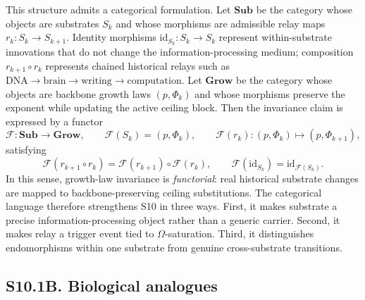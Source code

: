 \documentclass[11pt]{article}
\begin{document}
This structure admits a categorical formulation. Let $\mathbf{Sub}$ be the
category whose objects are substrates $S_k$ and whose morphisms are admissible
relay maps $r_k:S_k\to S_{k+1}$. Identity morphisms
$\mathrm{id}_{S_k}:S_k\to S_k$ represent within-substrate innovations that do
not change the information-processing medium; composition
$r_{k+1}\circ r_k$ represents chained historical relays such as
$\mathrm{DNA}\to\mathrm{brain}\to\mathrm{writing}\to\mathrm{computation}$.
Let $\mathbf{Grow}$ be the category whose objects are backbone growth laws
$(p,\Phi_k)$ and whose morphisms preserve the exponent while updating the
active ceiling block. Then the invariance claim is expressed by a functor
\begin{equation}
\mathcal F:\mathbf{Sub}\longrightarrow\mathbf{Grow},\qquad
\mathcal F(S_k)=(p,\Phi_k),\qquad
\mathcal F(r_k):(p,\Phi_k)\mapsto(p,\Phi_{k+1}),
\label{eq:S10_functor}
\end{equation}
satisfying
\begin{equation}
\mathcal F(r_{k+1}\circ r_k)=\mathcal F(r_{k+1})\circ\mathcal F(r_k),\qquad
\mathcal F(\mathrm{id}_{S_k})=\mathrm{id}_{\mathcal F(S_k)}.
\end{equation}
In this sense, growth-law invariance is \emph{functorial}: real historical
substrate changes are mapped to backbone-preserving ceiling substitutions.
The categorical language therefore strengthens S10 in three ways. First, it
makes substrate a precise information-processing object rather than a generic
carrier. Second, it makes relay a trigger event tied to $\Omega$-saturation.
Third, it distinguishes endomorphisms within one substrate from genuine
cross-substrate transitions.

\subsection*{S10.1B. Biological analogues}

\end{document}
